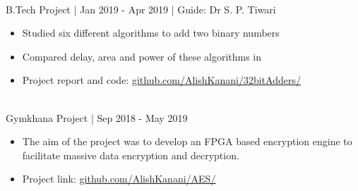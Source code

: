 \documentclass[]{resume}
\begin{document}
\begin{minipage}[t]{0.66\textwidth}
\vspace{-0.5em}
\hspace{1em}
\\
\hspace*{1em} B.Tech Project | Jan 2019 - Apr 2019 | Guide: Dr S. P. Tiwari\\ 
\vspace{-2em}
\descript{}
\begin{itemize}
    \item Studied six different algorithms to add two binary numbers 
    \vspace{-0.6em}\\
    \item Compared delay, area and power of these algorithms in 
    \vspace{-0.6em}\\
    \item Project report and code:  {\href{https://github.com/AlishKanani/32bitAdders}{\underline{github.com/AlishKanani/32bitAdders/}}} \\
\end{itemize}
\sectionsep

\vspace{-0.5em}
\hspace{1em}
\\
\hspace*{1em} Gymkhana Project | Sep 2018 - May 2019   \\ 
\vspace{-2em}
\descript{}
\begin{itemize}
    \item The aim of the project was to develop an FPGA based encryption engine to facilitate massive data encryption and decryption.
    \vspace{-0.6em}\\
    \item Project link: {\href{https://github.com/AlishKanani/AES}{\underline{github.com/AlishKanani/AES/}}}
\end{itemize}
\sectionsep


\end{minipage}
\end{document}
